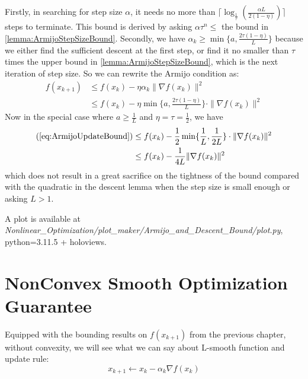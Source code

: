 \begin{note}
    Firstly, in searching for step size $\alpha$, it needs no more than $\lceil \log_{\frac{1}{\tau}} (\frac{\alpha L}{2(1-\eta)}) \rceil $ steps to terminate. This bound is derived by asking $\alpha \tau^n \leq $ the bound in \ref{lemma:ArmijoStepSizeBound}. Secondly, we have $\alpha_k \geq \min\{ a, \frac{2\tau(1 - \eta)}{L} \}$ because we either find the sufficient descent at the first step, or find it no smaller than $\tau$ times the upper bound in \ref{lemma:ArmijoStepSizeBound}, which is the next iteration of step size. So we can rewrite the Armijo condition as:
    \begin{align}
        f(x_{k+1}) &\leq f(x_k) - \eta \alpha_k\|\nabla f(x_k) \|^2 \\
        &\leq f(x_k) - \eta \min\{ a, \frac{2\tau(1-\eta)}{L} \} \cdot \|\nabla f(x_k) \|^2  \label{eq:ArmijoUpdateBound}
    \end{align}
    Now in the special case where $a \geq \frac{1}{L}$ and $\eta = \tau = \frac{1}{2}$, we have 
    \begin{align*}
        (\ref{eq:ArmijoUpdateBound}) &\leq f(x_k) - \frac{1}{2}\min\{\frac{1}{L}, \frac{1}{2L}\} \cdot \|\nabla f(x_k) \|^2 \\
        &\leq f(x_k) - \frac{1}{4L}\| \nabla f(x_k) \|^2
    \end{align*}
    which does not result in a great sacrifice on the tightness of the bound compared with the quadratic in the descent lemma when the step size is small enough or asking $L > 1$. 
    
    A plot is available at \emph{Nonlinear\_Optimization/plot\_maker/Armijo\_and\_Descent\_Bound/plot.py}, python=3.11.5 + holoviews.
\end{note}

\section{NonConvex Smooth Optimization Guarantee}
Equipped with the bounding results on $f(x_{k+1})$ from the previous chapter, without convexity, we will see what we can say about L-smooth function and update rule:
\begin{equation*}
    x_{k+1} \leftarrow x_k - \alpha_k \nabla f(x_k)
\end{equation*}

